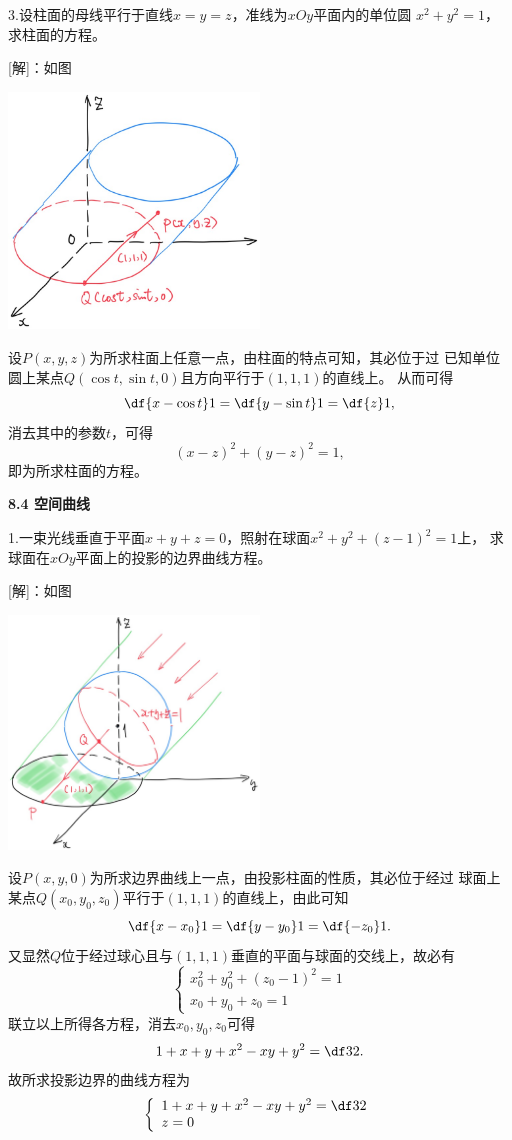 \bs

3.设柱面的母线平行于直线$x=y=z$，准线为$xOy$平面内的单位圆
$x^2+y^2=1$，求柱面的方程。

[解]：如图
\begin{center}
	\includegraphics[width=0.5\textwidth]{./images/ch8/cpq.jpg}
\end{center}
设$P(x,y,z)$为所求柱面上任意一点，由柱面的特点可知，其必位于过
已知单位圆上某点$Q(\cos t,\sin t,0)$且方向平行于$(1,1,1)$的直线上。
从而可得
$$\df{x-\cos t}1=\df{y-\sin t}1=\df{z}1,$$
消去其中的参数$t$，可得
$$(x-z)^2+(y-z)^2=1,$$
即为所求柱面的方程。\fin

\bs

\begin{center}
	\bf 8.4 空间曲线
\end{center}

1.一束光线垂直于平面$x+y+z=0$，照射在球面$x^2+y^2+(z-1)^2=1$上，
求球面在$xOy$平面上的投影的边界曲线方程。

[解]：如图
\begin{center}
	\includegraphics[width=0.5\textwidth]{./images/ch8/sunray.jpg}
\end{center}
设$P(x,y,0)$为所求边界曲线上一点，由投影柱面的性质，其必位于经过
球面上某点$Q(x_0,y_0,z_0)$平行于$(1,1,1)$的直线上，由此可知
$$\df{x-x_0}1=\df{y-y_0}1=\df{-z_0}1.$$
又显然$Q$位于经过球心且与$(1,1,1)$垂直的平面与球面的交线上，故必有
$$\left\{\begin{array}{l}
	x_0^2+y_0^2+(z_0-1)^2=1\\
	x_0+y_0+z_0=1
\end{array}\right.$$
联立以上所得各方程，消去$x_0,y_0,z_0$可得
$$1+x+y+x^2-xy+y^2=\df32.$$
故所求投影边界的曲线方程为
$$\left\{\begin{array}{l}
	1+x+y+x^2-xy+y^2=\df32\\
	z=0
\end{array}\right.$$
\fin

